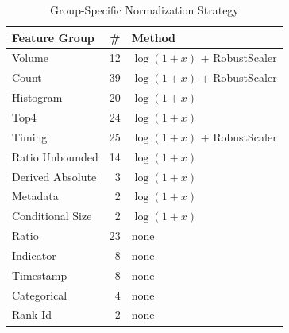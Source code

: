 \begin{table}[t]
\centering
\caption{Group-Specific Normalization Strategy}
\label{tab:normalization}
\begin{tabular}{lrl}
\toprule
\textbf{Feature Group} & \textbf{\#} & \textbf{Method} \\
\midrule
    Volume & 12 & $\log(1{+}x)$ + RobustScaler \\
    Count & 39 & $\log(1{+}x)$ + RobustScaler \\
    Histogram & 20 & $\log(1{+}x)$ \\
    Top4 & 24 & $\log(1{+}x)$ \\
    Timing & 25 & $\log(1{+}x)$ + RobustScaler \\
    Ratio Unbounded & 14 & $\log(1{+}x)$ \\
    Derived Absolute & 3 & $\log(1{+}x)$ \\
    Metadata & 2 & $\log(1{+}x)$ \\
    Conditional Size & 2 & $\log(1{+}x)$ \\
    Ratio & 23 & none \\
    Indicator & 8 & none \\
    Timestamp & 8 & none \\
    Categorical & 4 & none \\
    Rank Id & 2 & none \\
\bottomrule
\end{tabular}
\end{table}